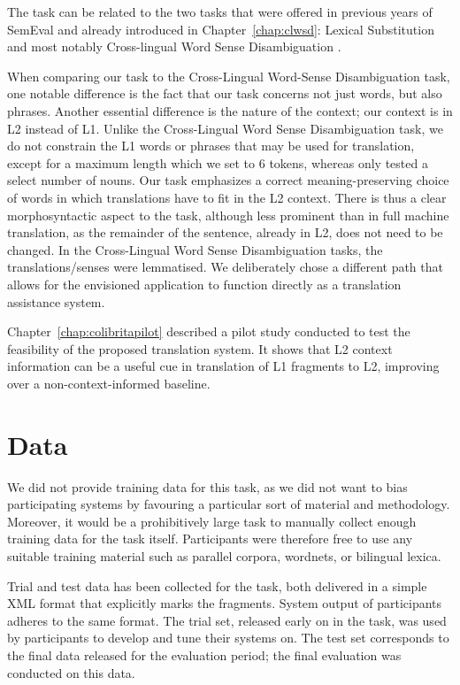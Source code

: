 The task can be related to the two tasks that were offered in previous years of
SemEval and already introduced in Chapter~\ref{chap:clwsd}: Lexical Substitution
\citep{CLLS} and most notably Cross-lingual Word Sense Disambiguation
\citep{Lefever2013}.

When comparing our task to the Cross-Lingual Word-Sense Disambiguation task,
one notable difference is the fact that our task concerns not just words, but
also phrases. Another essential difference is the nature of the context; our
context is in L2 instead of L1. Unlike the Cross-Lingual Word Sense
Disambiguation task, we do not constrain the L1 words or phrases that may be
used for translation, except for a maximum length which we set to 6 tokens,
whereas \cite{Lefever2013} only tested a select number of nouns. Our task
emphasizes a correct meaning-preserving choice of words in which translations
have to fit in the L2 context. There is thus a clear morphosyntactic aspect to
the task, although less prominent than in full machine translation, as the
remainder of the sentence, already in L2, does not need to be changed.  In the
Cross-Lingual Word Sense Disambiguation tasks, the translations/senses were
lemmatised. We deliberately chose a different path that allows for the
envisioned application to function directly as a translation assistance system.

Chapter~\ref{chap:colibritapilot} described a pilot study conducted to test the
feasibility of the proposed translation system. It shows that L2 context
information can be a useful cue in translation of L1 fragments to L2, improving
over a non-context-informed baseline.


\section{Data}
\label{sec:data}

We did not provide training data for this task, as we did not want to bias
participating systems by favouring a particular sort of material and
methodology. Moreover, it would be a prohibitively large task to manually
collect enough training data for the task itself. Participants were therefore
free to use any suitable training material such as parallel corpora, wordnets,
or bilingual lexica.

Trial and test data has been collected for the task, both delivered in a simple
XML format that explicitly marks the fragments. System output of participants
adheres to the same format. The trial set, released early on in the task, was
used by participants to develop and tune their systems on. The test set
corresponds to the final data released for the evaluation period; the final
evaluation was conducted on this data.

